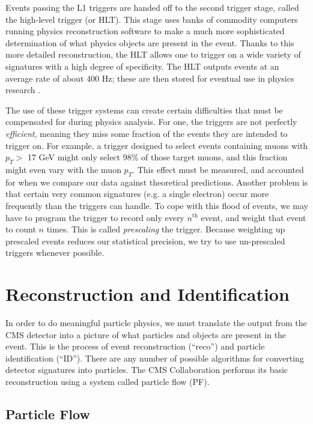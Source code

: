 Events passing the L1 triggers are handed off to the second trigger
stage, called the high-level trigger (or HLT). This stage uses
banks of commodity computers running physics reconstruction
software to make a much more sophisticated determination of what
physics objects are present in the event. Thanks to this more
detailed reconstruction, the HLT allows one to trigger on a wide
variety of signatures with a high degree of specificity. The HLT
outputs events at an average
rate of about 400 Hz; these are then stored for eventual use in
physics research \cite{trigger}.

The use of these trigger systems can create certain difficulties
that must be compensated for during physics analysis. For one, the
triggers are not perfectly \emph{efficient},
meaning they miss some fraction of the events they are intended to
trigger on. For example, a trigger designed to select events
containing muons with $p_T >$ 17 GeV might only select 98\% of those
target muons, and this fraction might even vary with the muon
$p_T$. This effect must be measured, and accounted for when we compare
our data against theoretical predictions. Another problem is that
certain very common signatures (e.g. a single electron) occur more
frequently than the triggers can handle. To cope with this flood of
events, we may have to program the trigger to record only every
$n^\text{th}$ event, and weight that event to count $n$
times. This is called \emph{prescaling} the trigger. Because
weighting up prescaled events reduces our statistical precision, we
try to use un-prescaled triggers whenever possible.

\section{Reconstruction and Identification}
\label{sec:cms:recoandid}

In order to do meaningful particle physics, we must translate the
output from the CMS detector into a picture of what particles and
objects are present in the event. This is the process of event
reconstruction (``reco'') and particle identification (``ID''). There
are any number of possible algorithms for converting detector
signatures into particles. The CMS Collaboration performs its basic
reconstruction using a system called particle flow (PF).

\subsection{Particle Flow}
\label{ssec:cms:reco:pf}

